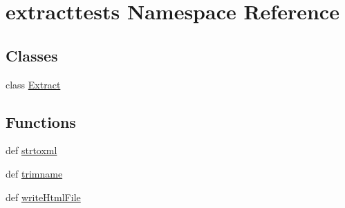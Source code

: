 \hypertarget{namespaceextracttests}{\section{extracttests Namespace Reference}
\label{namespaceextracttests}
}
\subsection*{Classes}
\begin{DoxyCompactItemize}
\item 
class \hyperlink{classextracttests_1_1_extract}{Extract}
\end{DoxyCompactItemize}
\subsection*{Functions}
\begin{DoxyCompactItemize}
\item 
def \hyperlink{namespaceextracttests_a0c2334b6daba7329aea0accc57c86cc8}{strtoxml}
\item 
def \hyperlink{namespaceextracttests_a2eebad21fec29f1c277bfae0abf44fca}{trimname}
\item 
def \hyperlink{namespaceextracttests_a1e699aa8791545c84a83bb5bdee22501}{write\-Html\-File}
\end{DoxyCompactItemize}
